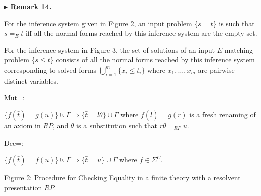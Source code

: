 \documentclass[10pt,a4paper]{amsart}
\begin{document}
 
 
\par\medskip\noindent\textbf{$\blacktriangleright$ Remark 14.}\par
 
 
For the inference system given in Figure 2, an input problem $\{s=t\}$ is such that $s=_{E}t$ iff all the normal forms reached by this inference system are the empty set.\par
 
 
 
For the inference system in Figure 3, the set of solutions of an input $E$-matching problem $\{s\leq t\}$ consists of all the normal forms reached by this inference system corresponding to solved forms $\bigcup_{i=1}^{m}\{x_{i}\leq t_{i}\}$ where $x_{1},\dots,x_{m}$ are pairwise distinct variables.\par
 
 
 
    
\par
 
Mut=:\par
 
\par
 
$\{f(\bar{t})=g(\bar{u})\}\uplus\Gamma\Longrightarrow\{\bar{t}=\bar{l}\theta\}\cup\Gamma$ where $f(\bar{l})=g(\bar{r})$ is a fresh renaming of an axiom in $RP$, and $\theta$ is a substitution such that $\bar{r}\theta=_{RP}\bar{u}$.\par
     
\par
 
Dec=:\par
 
\par
 
$\{f(\bar{t})=f(\bar{u})\}\uplus\Gamma\Longrightarrow\{\bar{t}=\bar{u}\}\cup\Gamma$ where $f\in{\Sigma}^{C}$.\par
    
Figure 2: Procedure for Checking Equality in a finite theory with a resolvent presentation $RP$.\par
 
 
\end{document}

